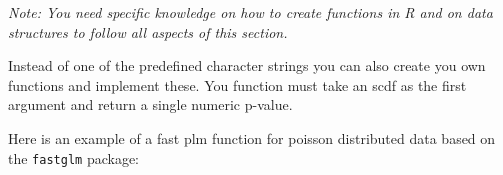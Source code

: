 \documentclass[
]{book}
\newenvironment{Shaded}{\begin{snugshade}}{\end{snugshade}}
\newcommand{\AttributeTok}[1]{\textcolor[rgb]{0.77,0.63,0.00}{#1}}
\newcommand{\ConstantTok}[1]{\textcolor[rgb]{0.00,0.00,0.00}{#1}}
\newcommand{\ControlFlowTok}[1]{\textcolor[rgb]{0.13,0.29,0.53}{\textbf{#1}}}
\newcommand{\DecValTok}[1]{\textcolor[rgb]{0.00,0.00,0.81}{#1}}
\newcommand{\FunctionTok}[1]{\textcolor[rgb]{0.00,0.00,0.00}{#1}}
\newcommand{\NormalTok}[1]{#1}
\newcommand{\OtherTok}[1]{\textcolor[rgb]{0.56,0.35,0.01}{#1}}
\newcommand{\SpecialCharTok}[1]{\textcolor[rgb]{0.00,0.00,0.00}{#1}}
\newcommand{\StringTok}[1]{\textcolor[rgb]{0.31,0.60,0.02}{#1}}
\begin{document}
\emph{Note: You need specific knowledge on how to create functions in R and on data structures to follow all aspects of this section.}

Instead of one of the predefined character strings you can also create you own functions and implement these. You function must take an scdf as the first argument and return a single numeric p-value.

Here is an example of a fast plm function for poisson distributed data based on the \texttt{fastglm} package:

\begin{Shaded}
\end{Shaded}
\end{document}
